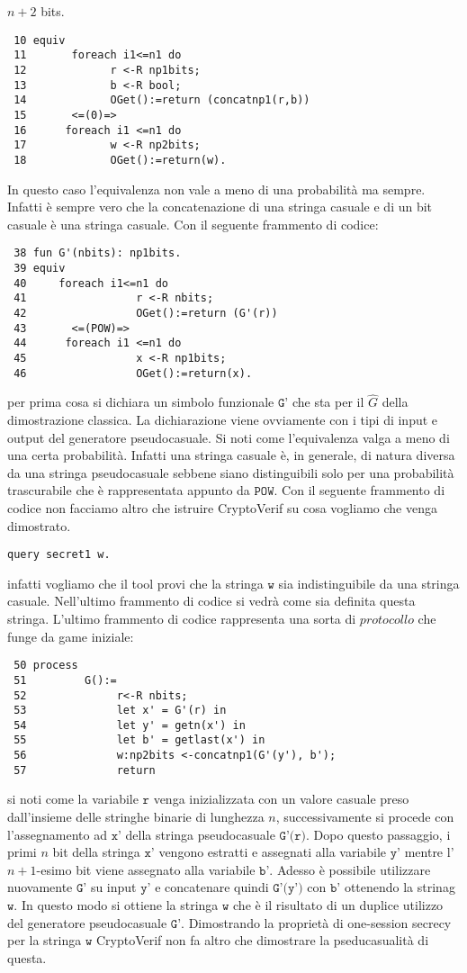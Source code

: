 \documentclass[a4paper,openright,twoside,12pt]{report}
\begin{document}
$n+2$ bits. 
\begin{verbatim}
 10 equiv
 11       foreach i1<=n1 do
 12             r <-R np1bits;
 13             b <-R bool;
 14             OGet():=return (concatnp1(r,b))
 15       <=(0)=>
 16      foreach i1 <=n1 do
 17             w <-R np2bits;
 18             OGet():=return(w).
\end{verbatim} 
In questo caso l'equivalenza non vale a meno di una probabilit\`a ma sempre. Infatti \`e sempre vero che la concatenazione di una stringa casuale e di un bit casuale \`e una stringa casuale.
Con il seguente frammento di codice:
\begin{verbatim}
 38 fun G'(nbits): np1bits.
 39 equiv
 40     foreach i1<=n1 do
 41                 r <-R nbits;
 42                 OGet():=return (G'(r))
 43       <=(POW)=> 
 44      foreach i1 <=n1 do
 45                 x <-R np1bits;
 46                 OGet():=return(x).
\end{verbatim}
per prima cosa si dichiara un simbolo funzionale $\texttt{G'}$ che sta per il $\hat{G}$ della dimostrazione classica. La dichiarazione viene ovviamente con i tipi di input e output del generatore pseudocasuale.
Si noti come l'equivalenza valga a meno di una certa probabilit\`a. Infatti una stringa casuale \`e, in generale, di natura diversa da una stringa pseudocasuale sebbene siano distinguibili solo per una probabilit\`a trascurabile
che \`e rappresentata appunto da $\texttt{POW}$.
Con il seguente frammento di codice non facciamo altro che istruire CryptoVerif su cosa vogliamo che venga dimostrato.
\begin{verbatim}
query secret1 w.
\end{verbatim}
infatti vogliamo che il tool provi che la stringa $\texttt{w}$ sia indistinguibile da una stringa casuale. Nell'ultimo frammento di codice si vedr\`a come sia definita questa stringa.
L'ultimo frammento di codice rappresenta una sorta di $protocollo$ che funge da game iniziale:
\begin{verbatim}
 50 process
 51         G():=
 52              r<-R nbits;
 53              let x' = G'(r) in
 54              let y' = getn(x') in
 55              let b' = getlast(x') in
 56              w:np2bits <-concatnp1(G'(y'), b');
 57              return
\end{verbatim}
si noti come la variabile $\texttt{r}$ venga inizializzata con un valore casuale preso dall'insieme delle stringhe binarie di lunghezza $n$, successivamente si procede con l'assegnamento ad $\texttt{x'}$ della stringa pseudocasuale
$\texttt{G'(r)}$. Dopo questo passaggio, i primi $n$ bit della stringa $\texttt{x'}$ vengono estratti e assegnati alla variabile $\texttt{y'}$ mentre l'$n+1$-esimo bit viene assegnato alla variabile 
$\texttt{b'}$. Adesso \`e possibile utilizzare nuovamente $\texttt{G'}$ su input $\texttt{y'}$ e concatenare quindi $\texttt{G'(y')}$ con $\texttt{b'}$ ottenendo la strinag $\texttt{w}$.
In questo modo si ottiene la stringa $\texttt{w}$ che \`e il risultato di un duplice utilizzo del generatore pseudocasuale $\texttt{G'}$. Dimostrando la propriet\`a di one-session secrecy per la stringa $\texttt{w}$ CryptoVerif
non fa altro che dimostrare la pseducasualit\`a di questa.
\newpage
\end{document}
